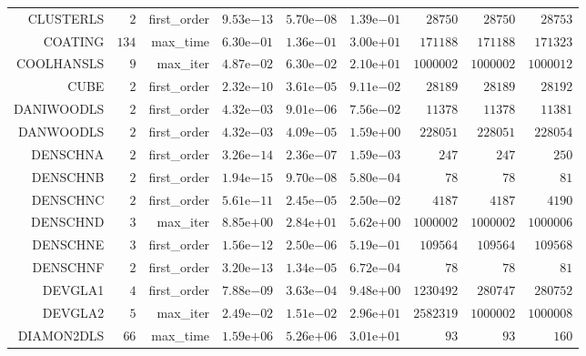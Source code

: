 \begin{longtable}{rrrrrrrrr}
CLUSTERLS & \(     2\) & first\_order & \( 9.53\)e\(-13\) & \( 5.70\)e\(-08\) & \( 1.39\)e\(-01\) & \( 28750\) & \( 28750\) & \( 28753\) \\
COATING & \(   134\) & max\_time & \( 6.30\)e\(-01\) & \( 1.36\)e\(-01\) & \( 3.00\)e\(+01\) & \(171188\) & \(171188\) & \(171323\) \\
COOLHANSLS & \(     9\) & max\_iter & \( 4.87\)e\(-02\) & \( 6.30\)e\(-02\) & \( 2.10\)e\(+01\) & \(1000002\) & \(1000002\) & \(1000012\) \\
CUBE & \(     2\) & first\_order & \( 2.32\)e\(-10\) & \( 3.61\)e\(-05\) & \( 9.11\)e\(-02\) & \( 28189\) & \( 28189\) & \( 28192\) \\
DANIWOODLS & \(     2\) & first\_order & \( 4.32\)e\(-03\) & \( 9.01\)e\(-06\) & \( 7.56\)e\(-02\) & \( 11378\) & \( 11378\) & \( 11381\) \\
DANWOODLS & \(     2\) & first\_order & \( 4.32\)e\(-03\) & \( 4.09\)e\(-05\) & \( 1.59\)e\(+00\) & \(228051\) & \(228051\) & \(228054\) \\
DENSCHNA & \(     2\) & first\_order & \( 3.26\)e\(-14\) & \( 2.36\)e\(-07\) & \( 1.59\)e\(-03\) & \(   247\) & \(   247\) & \(   250\) \\
DENSCHNB & \(     2\) & first\_order & \( 1.94\)e\(-15\) & \( 9.70\)e\(-08\) & \( 5.80\)e\(-04\) & \(    78\) & \(    78\) & \(    81\) \\
DENSCHNC & \(     2\) & first\_order & \( 5.61\)e\(-11\) & \( 2.45\)e\(-05\) & \( 2.50\)e\(-02\) & \(  4187\) & \(  4187\) & \(  4190\) \\
DENSCHND & \(     3\) & max\_iter & \( 8.85\)e\(+00\) & \( 2.84\)e\(+01\) & \( 5.62\)e\(+00\) & \(1000002\) & \(1000002\) & \(1000006\) \\
DENSCHNE & \(     3\) & first\_order & \( 1.56\)e\(-12\) & \( 2.50\)e\(-06\) & \( 5.19\)e\(-01\) & \(109564\) & \(109564\) & \(109568\) \\
DENSCHNF & \(     2\) & first\_order & \( 3.20\)e\(-13\) & \( 1.34\)e\(-05\) & \( 6.72\)e\(-04\) & \(    78\) & \(    78\) & \(    81\) \\
DEVGLA1 & \(     4\) & first\_order & \( 7.88\)e\(-09\) & \( 3.63\)e\(-04\) & \( 9.48\)e\(+00\) & \(1230492\) & \(280747\) & \(280752\) \\
DEVGLA2 & \(     5\) & max\_iter & \( 2.49\)e\(-02\) & \( 1.51\)e\(-02\) & \( 2.96\)e\(+01\) & \(2582319\) & \(1000002\) & \(1000008\) \\
DIAMON2DLS & \(    66\) & max\_time & \( 1.59\)e\(+06\) & \( 5.26\)e\(+06\) & \( 3.01\)e\(+01\) & \(    93\) & \(    93\) & \(   160\) \\

\end{longtable}
